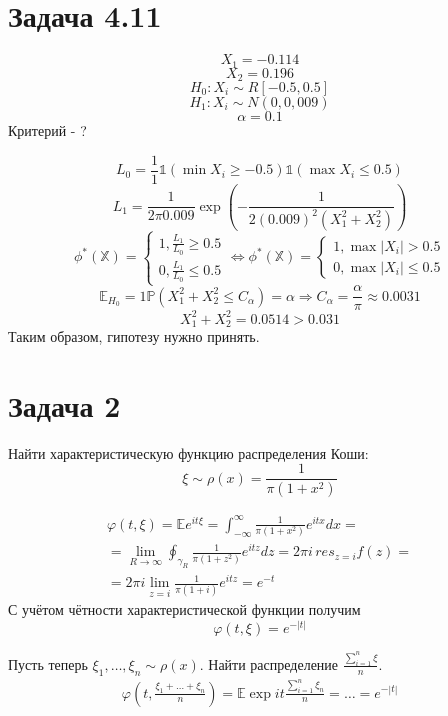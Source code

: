 \documentclass[11pt]{article}
\author{Sergey Makarov}
\date{\today}
\title{}
\begin{document}
\section{Задача 4.11}
\label{sec:org297c2a1}
$$X_1 = -0.114$$
$$X_2 = 0.196$$
$$H_0: X_i \sim R[-0.5, 0.5]$$
$$H_1: X_i \sim N(0, 0,009)$$
$$\alpha = 0.1$$
Критерий - ?

$$L_0 = \frac{1}1\mathbb{1}(\min X_i \geq -0.5)\mathbb{1}(\max X_i \leq 0.5)$$
$$L_1 = \frac{1}{2\pi 0.009}\exp\left(-\frac{1}{2(0.009)^2(X_1^2+X_2^2)}\right)$$
\begin{equation*}
\phi^*(\mathbb{X}) = \begin{cases}
1, \frac{L_1}{L_0} \geq 0.5\\
0, \frac{L_1}{L_0} \leq 0.5
\end{cases} \Leftrightarrow \phi^*(\mathbb{X}) = \begin{cases}
1, \max |X_i| > 0.5\\
0, \max |X_i| \leq 0.5
\end{cases}
\end{equation*}
$$\mathbb{E}_{H_0} = 1\mathbb{P}{(X_1^2 + X_2^2 \leq C_\alpha)} = \alpha
\Rightarrow C_\alpha = \frac{\alpha}{\pi} \approx 0.0031$$
$$X_1^2 + X_2^2 = 0.0514 > 0.031$$
Таким образом, гипотезу нужно принять.
\section{Задача 2}
\label{sec:org19a60f0}
Найти характеристическую функцию распределения Коши:
$$\xi \sim \rho(x) = \frac{1}{\pi(1 + x^2)}$$

\begin{multline*}
\varphi(t, \xi) = \mathbb{E}e^{it\xi} = \int_{-\infty}^\infty\frac{1}{\pi(1+x^2)}e^{itx}dx = \\
 = \lim_{R \to \infty}\oint_{\gamma_R}\frac{1}{\pi(1+z^2)}e^{itz}dz = 2\pi i\, res_{z=i} f(z) = \\
 = 2\pi i \lim_{z=i}\frac{1}{\pi(1+i)}e^{itz} = e^{-t}
\end{multline*}
С учётом чётности характеристической функции получим $$\varphi(t, \xi) = e^{-|t|}$$

Пусть теперь \(\xi_1, \ldots, \xi_n \sim \rho(x)\). Найти распределение \(\frac{\sum_{i = 1}^n\xi}{n}\).
\begin{multline*}
\varphi(t, \frac{\xi_1 + \ldots + \xi_n}{n}) = \mathbb{E}\exp{it\frac{\sum_{i = 1}^n\xi_n}{n}} = \ldots = e^{-|t|}
\end{multline*}
\end{document}

